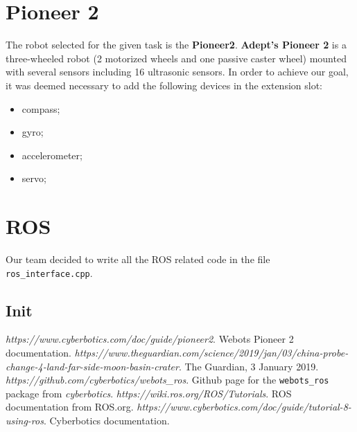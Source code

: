 \documentclass[a4paper]{article}
\begin{document}
	\section{Pioneer 2}
	The robot selected for the given task is the \textbf{Pioneer2}. \newline\textbf{Adept's Pioneer 2}\cite{pioneer2} is a three-wheeled robot (2 motorized wheels and one passive caster wheel) mounted with several sensors including 16 ultrasonic sensors.
	In order to achieve our goal, it was deemed necessary to add the following devices in the extension slot:
		\begin{itemize}
			\item compass;
			\item gyro;
			\item accelerometer;
			\item servo;
		\end{itemize}
	
	\section{ROS}
	Our team decided to write all the ROS related code in the file \texttt{ros\_interface.cpp}.
	\subsection{Init}
	
	
	\newpage
	
	\begin{thebibliography}{9}
		\textit{https://www.cyberbotics.com/doc/guide/pioneer2}. \newline
		Webots Pioneer 2 documentation.
		\textit{https://www.theguardian.com/science/2019/jan/03/china-probe-change-4-land-far-side-moon-basin-crater}. \newline
		The Guardian, 3 January 2019.
		\textit{https://github.com/cyberbotics/webots\_ros}. \newline
		Github page for the \texttt{webots\_ros} package from \textit{cyberbotics}.
		\textit{https://wiki.ros.org/ROS/Tutorials}. \newline
		ROS documentation from ROS.org.
		\textit{https://www.cyberbotics.com/doc/guide/tutorial-8-using-ros}. \newline
		Cyberbotics documentation.
	\end{thebibliography}
\end{document}
